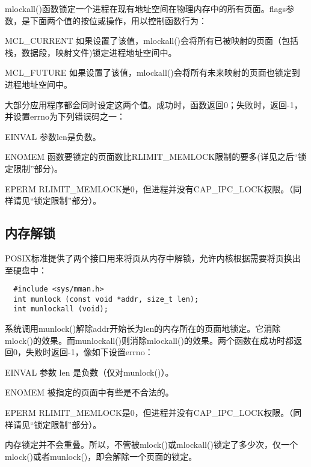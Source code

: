 mlockall()函数锁定一个进程在现有地址空间在物理内存中的所有页面。flags参数，是下面两个值的按位或操作，用以控制函数行为： 

\begin{eqlist*}
\item[MCL\_CURRENT] 如果设置了该值，mlockall()会将所有已被映射的页面（包括栈，数据段，映射文件)锁定进程地址空间中。 
\item[MCL\_FUTURE] 如果设置了该值，mlockall()会将所有未来映射的页面也锁定到进程地址空间中。
\end{eqlist*}

大部分应用程序都会同时设定这两个值。成功时，函数返回0；失败时，返回-1，并设置errno为下列错误码之一： 

\begin{eqlist*}
\item[EINVAL] 参数len是负数。
\item[ENOMEM] 函数要锁定的页面数比RLIMIT\_MEMLOCK限制的要多(详见之后“锁定限制”部分)。
\item[EPERM] RLIMIT\_MEMLOCK是0，但进程并没有CAP\_IPC\_LOCK权限。（同样请见“锁定限制”部分）。
\end{eqlist*}

\subsection{内存解锁}

POSIX标准提供了两个接口用来将页从内存中解锁，允许内核根据需要将页换出至硬盘中： 

\begin{lstlisting}
  #include <sys/mman.h>
  int munlock (const void *addr, size_t len);
  int munlockall (void);
\end{lstlisting}

系统调用munlock()解除addr开始长为len的内存所在的页面地锁定。它消除mlock()的效果。而munlockall()则消除mlockall()的效果。两个函数在成功时都返回0，失败时返回-1，像如下设置errno： 

\begin{eqlist*}
\item[EINVAL] 参数 len 是负数（仅对munlock()）。
\item[ENOMEM] 被指定的页面中有些是不合法的。
\item[EPERM] RLIMIT\_MEMLOCK是0，但进程并没有CAP\_IPC\_LOCK权限。（同样请见“锁定限制”部分）。
\end{eqlist*}

内存锁定并不会重叠。所以，不管被mlock()或mlockall()锁定了多少次，仅一个mlock()或者munlock()，即会解除一个页面的锁定。 

